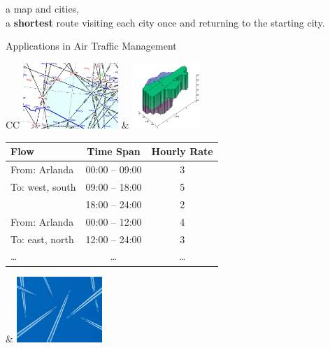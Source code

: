 \documentclass{cons-beamer}
\begin{document}
\begin{frame}
  \begin{example}
     a map and cities, \\  a
    \textbf{shortest} route visiting each city once and returning to
    the starting city.
  \end{example}
\end{frame}

\begin{frame}{Applications in Air Traffic Management}
  \begin{tabular}{CC}
     \newline
    \includegraphics[height=25mm]{images/routes}
    &
     \newline
    \includegraphics[height=25mm]{images/sectorLondon}    
    \\[+8mm]
     \newline\newline
    \tiny
    \begin{tabular}{|l|c|c|}
      \hline
      Flow & Time Span & Hourly Rate \\
      \hline
      From: Arlanda   & 00:00 -- 09:00 & 3 \\
      To: west, south & 09:00 -- 18:00 & 5 \\
                      & 18:00 -- 24:00 & 2 \\
      \hline
      From: Arlanda   & 00:00 -- 12:00 & 4 \\
      To: east, north & 12:00 -- 24:00 & 3 \\
      \hline
      \dots & \dots & \dots \\
      \hline
    \end{tabular}
    &
     \newline
    \includegraphics[height=25mm]{images/atm}
  \end{tabular}
\end{frame}
\end{document}
